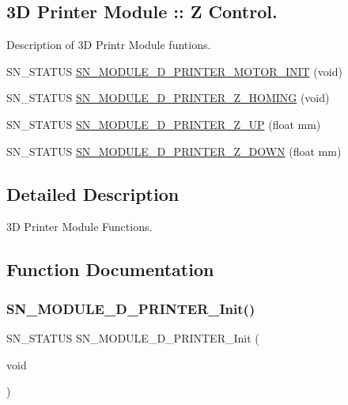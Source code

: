 \subsection*{3D Printer Module \+:\+: Z Control.}
\label{_amgrp0b5aafc53c5099dcb4016e710d2ae272}%
Description of 3D Printr Module funtions. \begin{DoxyCompactItemize}
\item 
S\+N\+\_\+\+S\+T\+A\+T\+US \hyperlink{group__D_gafc569784fa8758bec7c2f90b1a7f1404}{S\+N\+\_\+\+M\+O\+D\+U\+L\+E\+\_\+D\+\_\+\+P\+R\+I\+N\+T\+E\+R\+\_\+\+M\+O\+T\+O\+R\+\_\+\+I\+N\+IT} (void)
\item 
S\+N\+\_\+\+S\+T\+A\+T\+US \hyperlink{group__D_gafa7b9a2a41989695e1b881b984794432}{S\+N\+\_\+\+M\+O\+D\+U\+L\+E\+\_\+D\+\_\+\+P\+R\+I\+N\+T\+E\+R\+\_\+\+Z\+\_\+\+H\+O\+M\+I\+NG} (void)
\item 
S\+N\+\_\+\+S\+T\+A\+T\+US \hyperlink{group__D_ga4671a91d49ef53f67f1d203f18355c63}{S\+N\+\_\+\+M\+O\+D\+U\+L\+E\+\_\+D\+\_\+\+P\+R\+I\+N\+T\+E\+R\+\_\+\+Z\+\_\+\+UP} (float mm)
\item 
S\+N\+\_\+\+S\+T\+A\+T\+US \hyperlink{group__D_ga5747a0d753cb9d79747db6f4a22b18e9}{S\+N\+\_\+\+M\+O\+D\+U\+L\+E\+\_\+D\+\_\+\+P\+R\+I\+N\+T\+E\+R\+\_\+\+Z\+\_\+\+D\+O\+WN} (float mm)
\end{DoxyCompactItemize}


\subsection{Detailed Description}
3D Printer Module Functions. 



\subsection{Function Documentation}
\mbox{\label{group__D_ga801e265ffe6f8c56081112f4fdd35f39}} 
\subsubsection{\texorpdfstring{S\+N\+\_\+\+M\+O\+D\+U\+L\+E\+\_\+D\+\_\+\+P\+R\+I\+N\+T\+E\+R\+\_\+\+Init()}{SN\_MODULE\_3D\_PRINTER\_Init()}}
{\footnotesize\ttfamily S\+N\+\_\+\+S\+T\+A\+T\+US S\+N\+\_\+\+M\+O\+D\+U\+L\+E\+\_\+D\+\_\+\+P\+R\+I\+N\+T\+E\+R\+\_\+\+Init (\begin{DoxyParamCaption}\item[{void}]{ }\end{DoxyParamCaption})}


